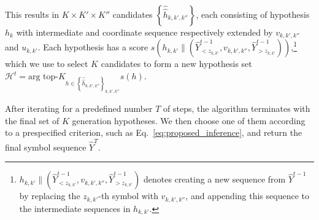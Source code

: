 \documentclass{article}
\DeclareMathOperator*{\argmax}{argmax}
\begin{document}
\iffalse
\begin{align*}
&\left\{ 
\hat{\hat{h}}_{k, k', k''}
\right\}_{k''=1}^{K''}
=\\
&=\text{arg~top-$K''$}_{v \in V}
\underbrace{s(h_k \| \text{one-hot}(u_{k,k'})) + \log p(y_{z_{k, k'}} = v | \hat{Y}^{\leq t}, X)}_{
=s(h_{k, k'} \| (\hat{Y}^{t-1}_{<z_{k,k'}},v,\hat{Y}^{t-1}_{>z_{k,k'}}))
}.
\end{align*}
\fi
This results in $K \times K' \times K''$ candidates $\left\{\hat{\hat{h}}_{k, k', k''}\right\}$, each consisting of hypothesis $h_k$ with intermediate and coordinate sequence respectively extended by $v_{k,k',k''}$ and $u_{k,k'}$. Each hypothesis has a score 
$s(h_{k, k'} \| (\hat{Y}^{t-1}_{<z_{k,k'}},v_{k, k',k''},\hat{Y}^{t-1}_{>z_{k,k'}}))$,\footnote{
$h_{k, k'} \| (\hat{Y}^{t-1}_{<z_{k,k'}},v_{k, k',k''},\hat{Y}^{t-1}_{>z_{k,k'}})$ denotes
creating a new sequence from $\hat{Y}^{t-1}$ by replacing the \mbox{$z_{k, k'}$-th} symbol with $v_{k, k',k''}$, and appending this sequence to the intermediate sequences in $h_{k,k'}$.
} 
which we use to select $K$ candidates to form a new hypothesis set 
\mbox{$\mathcal{H}^t = \text{arg~top-$K$}_{h \in \left\{ \hat{\hat{h}}_{k,k',k''} \right\}_{k,k',k''}} s(h)$}.

After iterating for a predefined number $T$ of steps, the algorithm terminates with the final set of $K$ generation hypotheses. We then choose one of them according to a prespecified criterion, such as Eq.~\eqref{eq:proposed_inference}, and return the final symbol sequence $\hat{Y}^T$.



\end{document}
